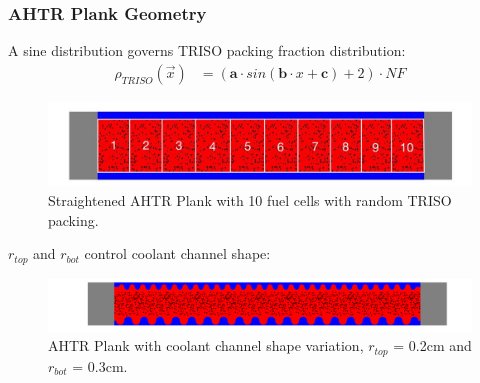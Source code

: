 \begin{frame}
    \frametitle{AHTR Plank Geometry}
    A sine distribution governs TRISO packing fraction distribution: 
    \begin{align}
        \rho_{TRISO}(\vec{x}) &= \left(\textbf{a}\cdot sin(\textbf{b}\cdot x + \textbf{c}) + 2\right) \cdot NF \nonumber
    \end{align}
    \begin{figure}
        \includegraphics[width=0.9\linewidth]{../docs/figures/straightened_plank.png} 
        \caption{Straightened AHTR Plank with 10 fuel cells with random TRISO packing.}
    \end{figure}
    $r_{top}$ and $r_{bot}$ control coolant channel shape: 
    \begin{figure}
        \includegraphics[width=\linewidth]{../docs/figures/coolant-channel-shape.png} 
        \caption{AHTR Plank with coolant channel shape variation, $r_{top}$ = 0.2cm and 
        $r_{bot}$ = 0.3cm.}
    \end{figure}
\end{frame}

